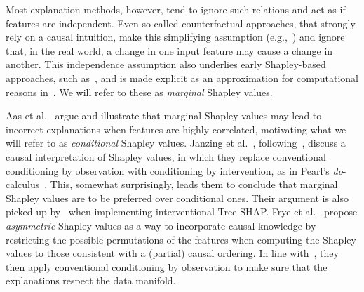 \documentclass{article}
\begin{document}
Most explanation methods, however, tend to ignore such relations and act as if features are independent. Even so-called counterfactual approaches, that strongly rely on a causal intuition, make this simplifying assumption (e.g.,~\cite{wachter2017counterfactual}) and ignore that, in the real world, a change in one input feature may cause a change in another. This independence assumption also underlies early Shapley-based approaches, such as~\cite{vstrumbelj2014explaining,datta2016algorithmic}, and is made explicit as an approximation for computational reasons in~\cite{lundberg2017unified}. We will refer to these as {\em marginal} Shapley values.

Aas et al.~\cite{aas2019explaining} argue and illustrate that marginal Shapley values may lead to incorrect explanations when features are highly correlated, motivating what we will refer to as {\em conditional} Shapley values. Janzing et al.~\cite{janzing2019feature}, following~\cite{datta2016algorithmic}, discuss a causal interpretation of Shapley values, in which they replace conventional conditioning by observation with conditioning by intervention, as in Pearl's {\em do}-calculus~\cite{pearl2012calculus}. This, somewhat surprisingly, leads them to conclude that marginal Shapley values are to be preferred over conditional ones. Their argument is also picked up by~\cite{lundberg2020local} when implementing interventional Tree SHAP. Frye et al.~\cite{frye2019asymmetric} propose {\em asymmetric} Shapley values as a way to incorporate causal knowledge by restricting the possible permutations of the features when computing the Shapley values to those consistent with a (partial) causal ordering. In line with~\cite{aas2019explaining}, they then apply conventional conditioning by observation to make sure that the explanations respect the data manifold.
\end{document}
